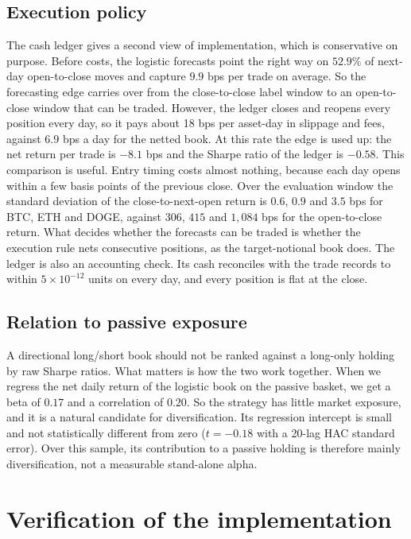 \documentclass[preprint,12pt,authoryear,a4paper]{elsarticle}
\begin{document}
\subsection{Execution policy}\label{ssec:ledger}

The cash ledger gives a second view of implementation, which is conservative on
purpose. Before costs, the logistic forecasts point the right way on $52.9\%$ of
next-day open-to-close moves and capture $9.9$ bps per trade on average. So the
forecasting edge carries over from the close-to-close label window to an
open-to-close window that can be traded. However, the ledger closes and reopens
every position every day, so it pays about 18 bps per asset-day in slippage and
fees, against $6.9$ bps a day for the netted book. At this rate the edge is used up:
the net return per trade is $-8.1$ bps and the Sharpe ratio of the ledger is
$-0.58$. This comparison is useful. Entry timing costs almost nothing, because each
day opens within a few basis points of the previous close. Over the evaluation
window the standard deviation of the close-to-next-open return is $0.6$, $0.9$ and
$3.5$ bps for BTC, ETH and DOGE, against $306$, $415$ and $1{,}084$ bps for the
open-to-close return. What decides whether the forecasts can be traded is whether
the execution rule nets consecutive positions, as the target-notional book does.
The ledger is also an accounting check. Its cash reconciles with the trade records
to within $5\times10^{-12}$ units on every day, and every position is flat at the
close.

\subsection{Relation to passive exposure}\label{ssec:bench}

A directional long/short book should not be ranked against a long-only holding by
raw Sharpe ratios. What matters is how the two work together. When we regress the
net daily return of the logistic book on the passive basket, we get a beta of
$0.17$ and a correlation of $0.20$. So the strategy has little market exposure, and
it is a natural candidate for diversification. Its regression intercept is small
and not statistically different from zero ($t=-0.18$ with a 20-lag HAC standard
error). Over this sample, its contribution to a passive holding is therefore mainly
diversification, not a measurable stand-alone alpha.

\section{Verification of the implementation}\label{sec:verification}
\end{document}
